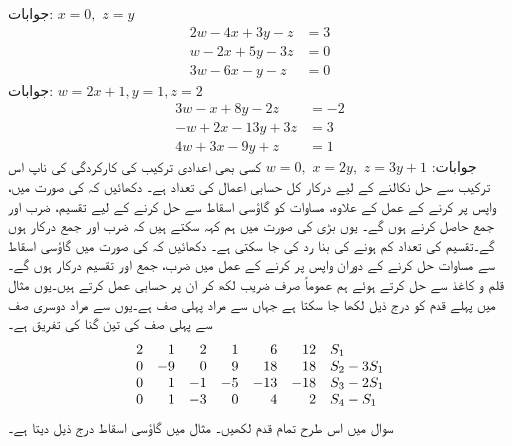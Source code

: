 جوابات:\quad
$x=0,\,\,z=y$
\quad
\begin{align*}
2w-4x+3y-z&=3\\
w-2x+5y-3z&=0\\
3w-6x-y-z&=0
\end{align*}
جوابات:\quad
$w=2x+1,y=1,z=2$
\quad
\begin{align*}
3w-x+8y-2z&=-2\\
-w+2x-13y+3z&=3\\
4w+3x-9y+z&=1
\end{align*}
جوابات:\quad
$w=0,\,\, x=2y,\,\,z=3y+1$
\quad {} کسی بھی اعدادی ترکیب کی کارکردگی کی ناپ اس ترکیب سے حل نکالنے کے لیے درکار  کل حسابی اعمال کی تعداد ہے۔ دکھائیں کہ  کی صورت میں، واپس پر کرنے کے عمل کے علاوہ، مساوات  کو گاؤسی اسقاط سے حل کرنے کے لیے  تقسیم،  ضرب اور  جمع حاصل کرنے ہوں گے۔ یوں بڑی  کی صورت میں ہم کہہ سکتے ہیں کہ    ضرب اور جمع  درکار ہوں گے۔تقسیم کی تعداد کم ہونے کی بنا رد کی جا سکتی ہے۔
\quad
دکھائیں کہ  کی صورت میں گاؤسی اسقاط سے مساوات  حل کرنے کے دوران واپس پر کرنے کے عمل میں   ضرب،  جمع اور  تقسیم درکار ہوں گے۔
\quad
قلم و کاغذ سے حل کرتے ہوئے ہم عموماً صرف  ضریب  لکھ کر ان پر حسابی عمل کرتے ہیں۔یوں مثال  میں پہلے قدم کو درج ذیل لکھا جا سکتا ہے جہاں  سے مراد پہلی صف ہے۔یوں  سے مراد دوسری صف سے پہلی صف کی تین گنا کی تفریق ہے۔
\begin{align*}
\centering
\begin{array}{rrrrrrl}
2&1&2&1&6&12& S_1\\
0&-9&0&9&18&18&S_2-3S_1\\
0&1&-1&-5&-13&-18&S_3-2S_1\\
0&1&-3&0&4&2&S_4-S_1
\end{array}
\end{align*} 
سوال  میں اس طرح تمام قدم لکھیں۔
\quad {} 
مثال  میں گاؤسی اسقاط درج ذیل دیتا ہے۔

